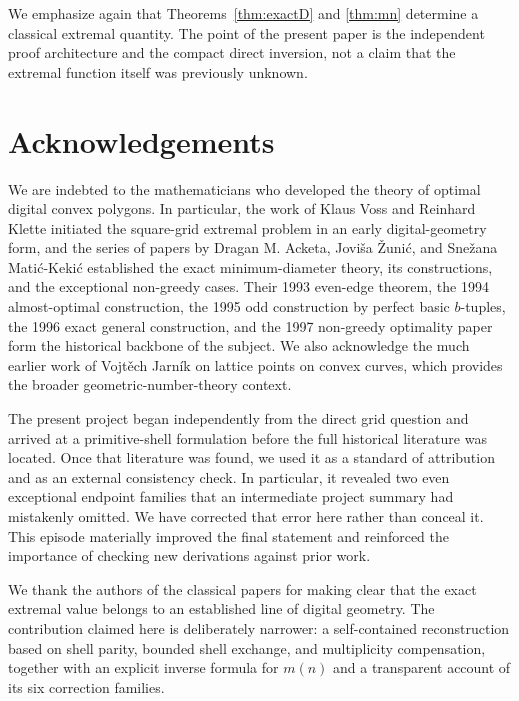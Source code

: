 \documentclass[11pt]{article}
\theoremstyle{definition}
\begin{document}
We emphasize again that Theorems~\ref{thm:exactD} and \ref{thm:mn} determine a classical extremal quantity.  The point of the present paper is the independent proof architecture and the compact direct inversion, not a claim that the extremal function itself was previously unknown.

\section*{Acknowledgements}

We are indebted to the mathematicians who developed the theory of optimal digital convex polygons.  In particular, the work of Klaus Voss and Reinhard Klette initiated the square-grid extremal problem in an early digital-geometry form, and the series of papers by Dragan M. Acketa, Joviša Žunić, and Snežana Matić-Kekić established the exact minimum-diameter theory, its constructions, and the exceptional non-greedy cases.  Their 1993 even-edge theorem, the 1994 almost-optimal construction, the 1995 odd construction by perfect basic \(b\)-tuples, the 1996 exact general construction, and the 1997 non-greedy optimality paper form the historical backbone of the subject.  We also acknowledge the much earlier work of Vojtěch Jarník on lattice points on convex curves, which provides the broader geometric-number-theory context.

The present project began independently from the direct grid question and arrived at a primitive-shell formulation before the full historical literature was located.  Once that literature was found, we used it as a standard of attribution and as an external consistency check.  In particular, it revealed two even exceptional endpoint families that an intermediate project summary had mistakenly omitted.  We have corrected that error here rather than conceal it.  This episode materially improved the final statement and reinforced the importance of checking new derivations against prior work.

We thank the authors of the classical papers for making clear that the exact extremal value belongs to an established line of digital geometry.  The contribution claimed here is deliberately narrower: a self-contained reconstruction based on shell parity, bounded shell exchange, and multiplicity compensation, together with an explicit inverse formula for \(m(n)\) and a transparent account of its six correction families.
\end{document}
